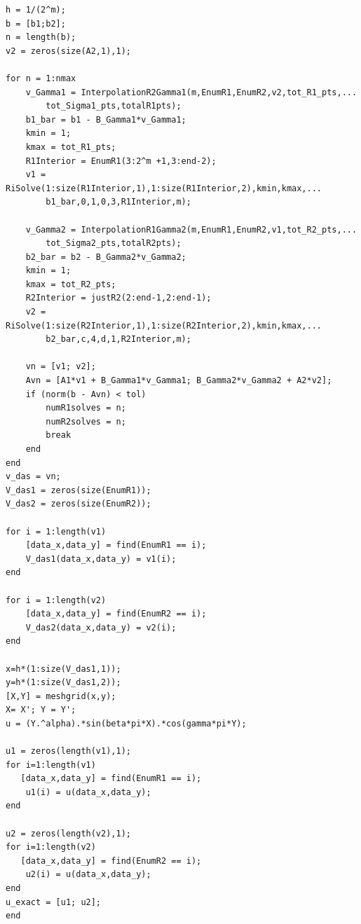 \documentclass[12pt]{article}
\begin{document}
\begin{itemize}
\begin{lstlisting}[caption=Discretized Alternating Schwarz]
h = 1/(2^m);
b = [b1;b2];
n = length(b);
v2 = zeros(size(A2,1),1);

for n = 1:nmax
    v_Gamma1 = InterpolationR2Gamma1(m,EnumR1,EnumR2,v2,tot_R1_pts,...
        tot_Sigma1_pts,totalR1pts);
    b1_bar = b1 - B_Gamma1*v_Gamma1; 
    kmin = 1;
    kmax = tot_R1_pts;
    R1Interior = EnumR1(3:2^m +1,3:end-2);
    v1 = RiSolve(1:size(R1Interior,1),1:size(R1Interior,2),kmin,kmax,...
        b1_bar,0,1,0,3,R1Interior,m);
    
    v_Gamma2 = InterpolationR1Gamma2(m,EnumR1,EnumR2,v1,tot_R2_pts,...
        tot_Sigma2_pts,totalR2pts);
    b2_bar = b2 - B_Gamma2*v_Gamma2;
    kmin = 1;
    kmax = tot_R2_pts;
    R2Interior = justR2(2:end-1,2:end-1);
    v2 = RiSolve(1:size(R2Interior,1),1:size(R2Interior,2),kmin,kmax,...
        b2_bar,c,4,d,1,R2Interior,m);
    
    vn = [v1; v2];
    Avn = [A1*v1 + B_Gamma1*v_Gamma1; B_Gamma2*v_Gamma2 + A2*v2];
    if (norm(b - Avn) < tol)
        numR1solves = n;
        numR2solves = n;
        break
    end
end
v_das = vn;
V_das1 = zeros(size(EnumR1));
V_das2 = zeros(size(EnumR2));

for i = 1:length(v1)
    [data_x,data_y] = find(EnumR1 == i);
    V_das1(data_x,data_y) = v1(i); 
end

for i = 1:length(v2)
    [data_x,data_y] = find(EnumR2 == i);
    V_das2(data_x,data_y) = v2(i); 
end

x=h*(1:size(V_das1,1));
y=h*(1:size(V_das1,2));
[X,Y] = meshgrid(x,y);
X= X'; Y = Y';
u = (Y.^alpha).*sin(beta*pi*X).*cos(gamma*pi*Y);

u1 = zeros(length(v1),1);
for i=1:length(v1)
   [data_x,data_y] = find(EnumR1 == i);
    u1(i) = u(data_x,data_y);
end

u2 = zeros(length(v2),1);
for i=1:length(v2)
   [data_x,data_y] = find(EnumR2 == i);
    u2(i) = u(data_x,data_y);
end
u_exact = [u1; u2];
end
\end{lstlisting}


\end{itemize}
\end{document}
